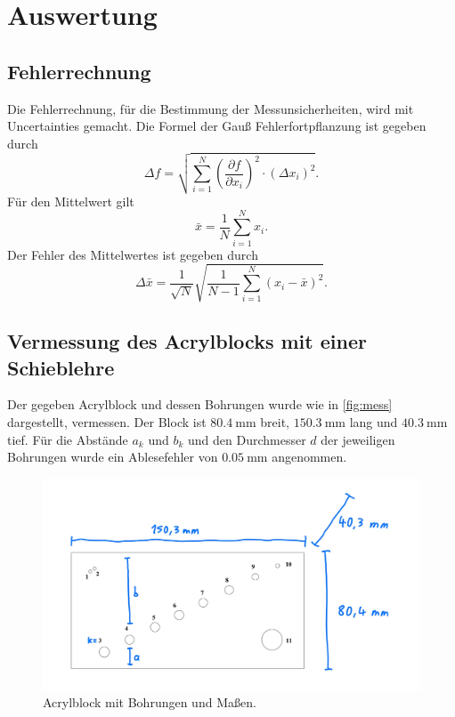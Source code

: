 \section{Auswertung}
\label{sec:auswertung}

\subsection{Fehlerrechnung}
\label{sec:Fehlerrechnung}
Die Fehlerrechnung, für die Bestimmung der Messunsicherheiten, wird mit Uncertainties \cite{uncertainties} gemacht.
Die Formel der Gauß Fehlerfortpflanzung ist gegeben durch
\begin{equation}
    \Delta f=\sqrt{\sum_{i=1}^N\left(\frac{\partial f}{\partial x_i}\right)^2 \cdot\left(\Delta x_i\right)^2}.
    \label{eqn:gauss}
\end{equation}
Für den Mittelwert gilt 
\begin{equation}
    \bar{x} = \frac{1}{N}\sum\limits_{i = 1}^N x_i .
    \label{eqn:mittelwert}
\end{equation}
Der Fehler des Mittelwertes ist gegeben durch 
\begin{equation}
    \Delta \bar{x}=\frac{1}{\sqrt{N}} \sqrt{\frac{1}{N-1} \sum_{i=1}^N\left(x_i-\bar{x}\right)^2}.
    \label{eqn:mittelwertfehler}
\end{equation}

\subsection{Vermessung des Acrylblocks mit einer Schieblehre}
\label{Vermessung des Acrylblocks mit einer Schieblehre}

Der gegeben Acrylblock und dessen Bohrungen wurde wie in \autoref{fig:mess} dargestellt, vermessen.
Der Block ist $\SI{80.4}{\milli\meter}$ breit, $\SI{150.3}{\milli\meter}$ lang und $\SI{40.3}{\milli\meter}$ tief.
Für die Abstände $a_k$ und $b_k$ und den Durchmesser $d$ der jeweiligen Bohrungen wurde ein Ablesefehler von $\SI{0.05}{\milli\meter}$
angenommen.
\begin{figure}[H]
    \centering
    \includegraphics[width=0.9\linewidth]{content/grafik/abmessung.jpg}
	\captionsetup{width=0.765\linewidth}
	\caption{Acrylblock mit Bohrungen und Maßen. \cite{scan}}
    \label{fig:mess}
\end{figure}

